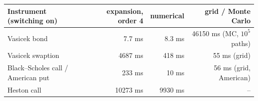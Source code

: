 \begin{tabular}{lrrr}\toprule
Instrument (switching on) & expansion, order 4 & numerical & grid / Monte Carlo\\\midrule
Vasicek bond & 7.7 ms & 8.3 ms & 46150 ms (MC, $10^5$ paths)\\
Vasicek swaption & 4687 ms & 418 ms & 55 ms (grid)\\
Black--Scholes call / American put & 233 ms & 10 ms & 56 ms (grid, American)\\
Heston call & 10273 ms & 9930 ms & --\\
\bottomrule\end{tabular}
